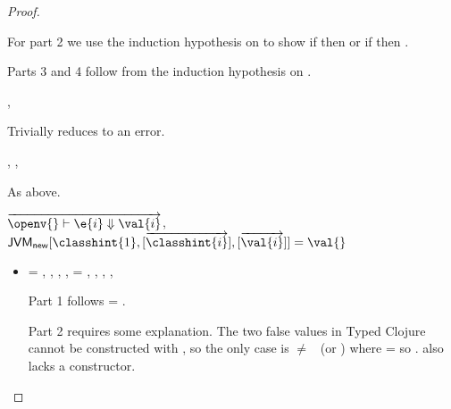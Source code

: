 \begin{lemma}
\begin{proof}
\begin{case}[B-Do]
\begin{itemize}
\begin{subcase}[T-Do]
For part 2 we use the induction hypothesis on 
to show if \istrueval{\val{}} then
        {\satisfies{\openv{}}{\thenprop{\prop{}}}}
        or
  if \isfalseval{\val{}} then
        {\satisfies{\openv{}}{\elseprop{\prop{}}}}.

Parts 3 and 4 follow from the induction hypothesis on .
    \end{subcase}
\end{itemize}
\end{case}

\begin{case}[BE-Do1]
  \opsem {\openv{}} {} {},
  \opsem {\openv{}} {\e{}} {\errorval{\val{}}}

        Trivially reduces to an error.
\end{case}

\begin{case}[BE-Do2]
  \opsem {\openv{}} {} {},
  \opsem {\openv{}} {} {\errorvalv{}},
  \opsem {\openv{}} {\e{}} {\errorvalv{}}

        As above.
\end{case}

\begin{case}[B-New]
  $
  \overrightarrow{
  \opsem {\openv{}}
         {\e{i}}
         {\val{i}}
       }$,
         $\newjava {\classhint{1}}
                  {\overrightarrow{\classhint{i}}}
                  {\overrightarrow{\val{i}}}
                  {\val{}}$

\begin{itemize}
  \item[]
\begin{subcase}[T-New]
  \ep{} = {\newexp {\class{}} {}},
  ,
  ,
  ,
  \e{} = { {\classhint{}} 
                                                          {\class{}} {}},
  \issubtypein{}{\javatotcexp{\classhint{}}}{\ty{}},
  \inpropenv{\topprop{}}{\thenprop{\prop{}}},
  \inpropenv{\botprop{}}{\elseprop{\prop{}}},
  \issubobjin{}{\emptyobject{}}{\object{}}

Part 1 follows \object{} = \emptyobject{}.

Part 2 requires some explanation. The two false values in Typed Clojure
cannot be constructed with \newliteral{}, so the only case is \val{} $\not=$ \false\ (or \nil)
where \thenprop{\prop{}} = \topprop{} so \satisfies{\openv{}}{\thenprop{\prop{}}}.
\Void{} also lacks a constructor.


\end{subcase}
\end{itemize}
\end{case}
\end{proof}
\end{lemma}
